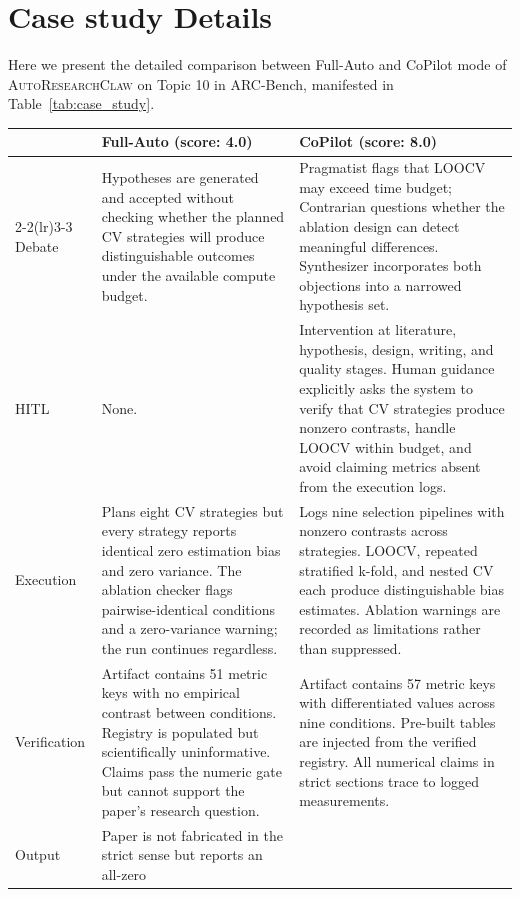 \documentclass{llmxive}
\providecommand{\system}{\textsc{AutoResearchClaw}}
\providecommand{\arraystretch}{1.3}
\begin{document}
\section{Case study Details}
\label{app:casestudy}
Here we present the detailed comparison between Full-Auto and CoPilot mode of \system{} on Topic 10 in ARC-Bench, manifested in Table~\ref{tab:case_study}.

\begin{table}[t]
\centering
\small
\renewcommand{\arraystretch}{1.3}
\setlength{\tabcolsep}{5pt}
\begin{tabular}{@{} l p{5.2cm} p{5.2cm} @{}}
\toprule
& \textbf{Full-Auto (score: 4.0)} & \textbf{CoPilot (score: 8.0)} \\
\cmidrule(lr){2-2}\cmidrule(lr){3-3}
Debate
& Hypotheses are generated and accepted without checking whether the
  planned CV strategies will produce distinguishable outcomes under the
  available compute budget.
& Pragmatist flags that LOOCV may exceed time budget; Contrarian questions
  whether the ablation design can detect meaningful differences.
  Synthesizer incorporates both objections into a narrowed hypothesis set. \\[3pt]
HITL
& None.
& Intervention at literature, hypothesis, design, writing, and quality
  stages. Human guidance explicitly asks the system to verify that CV
  strategies produce nonzero contrasts, handle LOOCV within budget, and
  avoid claiming metrics absent from the execution logs. \\[3pt]
Execution
& Plans eight CV strategies but every strategy reports identical zero
  estimation bias and zero variance. The ablation checker flags
  pairwise-identical conditions and a zero-variance warning; the run
  continues regardless.
& Logs nine selection pipelines with nonzero contrasts across strategies.
  LOOCV, repeated stratified k-fold, and nested CV each produce
  distinguishable bias estimates. Ablation warnings are recorded as
  limitations rather than suppressed. \\[3pt]
Verification
& Artifact contains 51 metric keys with no empirical contrast between
  conditions. Registry is populated but scientifically uninformative.
  Claims pass the numeric gate but cannot support the paper's
  research question.
& Artifact contains 57 metric keys with differentiated values across
  nine conditions. Pre-built tables are injected from the verified
  registry. All numerical claims in strict sections trace to logged
  measurements. \\[3pt]
Output
& Paper is not fabricated in the strict sense but reports an all-zero

\end{tabular}
\end{table}
\end{document}
